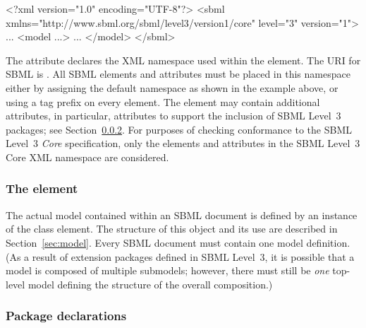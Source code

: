 \begin{example}
<?xml version="1.0" encoding="UTF-8"?>
<sbml xmlns="http://www.sbml.org/sbml/level3/version1/core" level="3" version="1">
  ...
  <model ...>
     ...
  </model>
</sbml>
\end{example}

The attribute  declares the XML namespace used within
the  element.  The URI for SBML \thisLV is
.  All SBML
\thisLV elements and attributes must be placed in this namespace
either by assigning the default namespace as shown in the example
above, or using a tag prefix on every element.  The 
element may contain additional attributes, in particular,
attributes to support the inclusion of SBML Level~3 packages; see
Section~\ref{sec:sbml-packages}.  For purposes of checking
conformance to the SBML Level~3 \emph{Core} specification, only
the elements and attributes in the SBML Level~3 Core XML namespace
are considered.


\subsubsection{The  element}

The actual model contained within an SBML document is defined by
an instance of the \Model class element.  The structure of this
object and its use are described in Section~\ref{sec:model}.
Every SBML document must contain one model definition.  (As a
result of extension packages defined in SBML Level~3, it is
possible that a model is composed of multiple submodels; however,
there must still be \emph{one} top-level model defining the
structure of the overall composition.)


\subsubsection{Package declarations}
\label{sec:sbml-packages}

